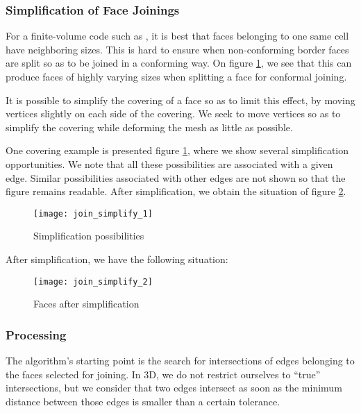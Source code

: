 \subsubsection{Simplification of Face Joinings\label{sec:join.simplif}}

For a finite-volume code such as \CS, it is best that faces belonging
to one same cell have neighboring sizes. This is hard to ensure
when non-conforming border faces are split so as to be joined
in a conforming way. On figure \ref{fig:algo.join.simplif},
we see that this can produce faces of highly varying sizes
when splitting a face for conformal joining.

It is possible to simplify the covering of a face so as to limit
this effect, by moving vertices slightly on each side of the covering.
We seek to move vertices so as to simplify the covering while
deforming the mesh as little as possible.

One covering example is presented figure \ref{fig:algo.join.simplif},
where we show several simplification opportunities. We note that all
these possibilities are associated with a given edge. Similar
possibilities associated with other edges are not shown so that the
figure remains readable. After simplification, we obtain the
situation of figure \ref{fig:algo.join.simpl2}.

\begin{figure}[!h]
\centerline{
\texttt{[image: join\_simplify\_1]}}
\caption{Simplification possibilities}
\label{fig:algo.join.simplif}
\end{figure}

After simplification, we have the following situation:

\begin{figure}[!h]
\centerline{
\texttt{[image: join\_simplify\_2]}}
\caption{Faces after simplification}
\label{fig:algo.join.simpl2}
\end{figure}

\subsubsection{Processing\label{sec:join.process}}

The algorithm's starting point is the search for intersections
of edges belonging to the faces selected for joining. In 3D, we
do not restrict ourselves to ``true'' intersections, but
we consider that two edges intersect as soon as the minimum
distance between those edges is smaller than a certain tolerance.

